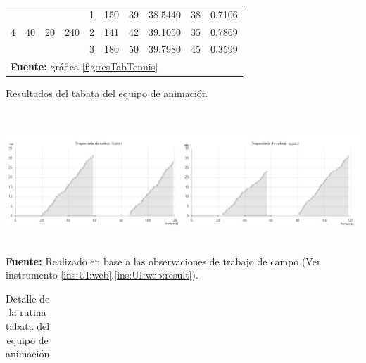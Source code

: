 \begin{landscape}
\begin{table}[H]
\begin{center}
\begin{tabular}{|l|l|l|l|l|l|l|l|l|l|}
\multirow{3}{*}{4} & \multirow{3}{*}{40} & \multirow{3}{*}{20} & \multirow{3}{*}{240} & 1 & 150 & 39 & 38.5440 & 38 & 0.7106 \\ \cline{5-10} 
 &  &  &  & 2 & 141 & 42 & 39.1050 & 35 & 0.7869 \\ \cline{5-10} 
 &  &  &  & 3 & 180 & 50 & 39.7980 & 45 & 0.3599 \\ \hline
 \multicolumn{10}{l}{\textbf{Fuente:} gr\'afica \ref{fig:resTabTennis}}
\end{tabular}
\end{center}
\end{table}
\begin{chart}[H]
	\caption{Resultados del tabata del equipo de animaci\'on}
	\label{fig:resTabCheerleader}
	\centering
	\includegraphics[width=610px,height=200px]{graphics/resultados/ResultRecognitionCheerleader.png} \\
	\textbf{Fuente:} Realizado en base a las observaciones de trabajo de campo (Ver instrumento \ref{ins:UI:web}.\ref{ins:UI:web:result}).
\end{chart}
\begin{table}[H]
\begin{center}
\caption{Detalle de la rutina tabata del equipo de animaci\'on}
\label{tab:detailResultsCheerleader}
\begin{tabular}{|l|l|l|l|l|l|l|l|l|l|}
\hline

\end{tabular}
\end{center}
\end{table}
\end{landscape}

